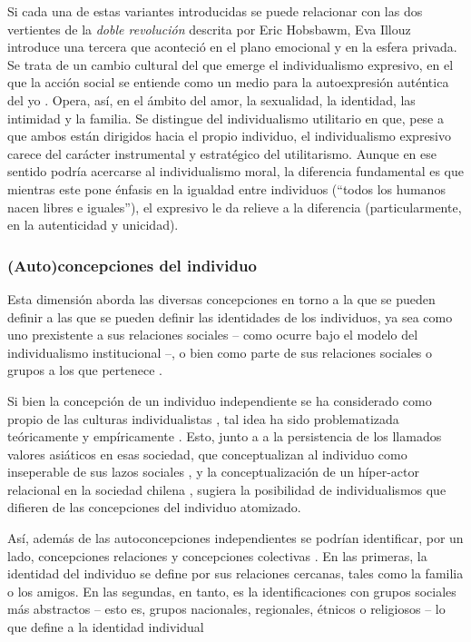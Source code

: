 \documentclass[12pt,twoside]{templates/facsothesis}
\begin{document}
Si cada una de estas variantes introducidas se puede relacionar con las dos vertientes de la \emph{doble revolución} descrita por Eric Hobsbawm, Eva Illouz \citeyearpar{illouz2020} introduce una tercera que aconteció en el plano emocional y en la esfera privada. Se trata de un cambio cultural del que emerge el individualismo expresivo, en el que la acción social se entiende como un medio para la autoexpresión auténtica del yo \citep{cortois2018}. Opera, así, en el ámbito del amor, la sexualidad, la identidad, las intimidad y la familia. Se distingue del individualismo utilitario en que, pese a que ambos están dirigidos hacia el propio individuo, el individualismo expresivo carece del carácter instrumental y estratégico del utilitarismo. Aunque en ese sentido podría acercarse al individualismo moral, la diferencia fundamental es que mientras este pone énfasis en la igualdad entre individuos (``todos los humanos nacen libres e iguales''), el expresivo le da relieve a la diferencia (particularmente, en la autenticidad y unicidad).

\hypertarget{autoconcepciones-del-individuo}{%
\subsubsection{(Auto)concepciones del individuo}\label{autoconcepciones-del-individuo}}

Esta dimensión aborda las diversas concepciones en torno a la que se pueden definir a las que se pueden definir las identidades de los individuos, ya sea como uno prexistente a sus relaciones sociales -- como ocurre bajo el modelo del individualismo institucional --, o bien como parte de sus relaciones sociales o grupos a los que pertenece \citep{brewer2007, martuccelli2018}.

Si bien la concepción de un individuo independiente se ha considerado como propio de las culturas individualistas \citep{benavides2020, cross2011}, tal idea ha sido problematizada teóricamente \citep{voronov2002} y empíricamente \citep{benavides2020, kolstad2009}. Esto, junto a a la persistencia de los llamados valores asiáticos en esas sociedad, que conceptualizan al individuo como inseperable de sus lazos sociales \citep{zhai2022}, y la conceptualización de un híper-actor relacional en la sociedad chilena \citep{araujo2020}, sugiera la posibilidad de individualismos que difieren de las concepciones del individuo atomizado.

Así, además de las autoconcepciones independientes se podrían identificar, por un lado, concepciones relaciones y concepciones colectivas \citep{brewer2007}. En las primeras, la identidad del individuo se define por sus relaciones cercanas, tales como la familia o los amigos. En las segundas, en tanto, es la identificaciones con grupos sociales más abstractos -- esto es, grupos nacionales, regionales, étnicos o religiosos -- lo que define a la identidad individual \citep{brewer2007}
\end{document}
